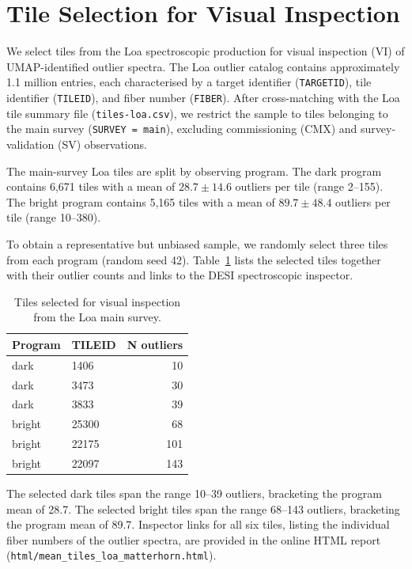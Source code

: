 \section{Tile Selection for Visual Inspection}

We select tiles from the Loa spectroscopic production for visual inspection (VI)
of UMAP-identified outlier spectra.
The Loa outlier catalog contains approximately 1.1 million entries,
each characterised by a target identifier (\texttt{TARGETID}), tile identifier (\texttt{TILEID}),
and fiber number (\texttt{FIBER}).
After cross-matching with the Loa tile summary file
(\texttt{tiles-loa.csv}), we restrict the sample to tiles belonging to the
main survey (\texttt{SURVEY = main}), excluding commissioning (CMX) and
survey-validation (SV) observations.

The main-survey Loa tiles are split by observing program.
The dark program contains 6{,}671 tiles with a mean of $28.7 \pm 14.6$ outliers per tile
(range 2--155).
The bright program contains 5{,}165 tiles with a mean of $89.7 \pm 48.4$ outliers per tile
(range 10--380).

To obtain a representative but unbiased sample, we randomly select three tiles
from each program (random seed 42).
Table~\ref{tab:vi_tiles_loa} lists the selected tiles together with their
outlier counts and links to the DESI spectroscopic inspector.

\begin{table}[h]
\centering
\caption{Tiles selected for visual inspection from the Loa main survey.}
\label{tab:vi_tiles_loa}
\begin{tabular}{llr}
\hline
Program & TILEID & N outliers \\
\hline
dark  & 1406  & 10  \\
dark  & 3473  & 30  \\
dark  & 3833  & 39  \\
\hline
bright & 25300 & 68  \\
bright & 22175 & 101 \\
bright & 22097 & 143 \\
\hline
\end{tabular}
\end{table}

The selected dark tiles span the range 10--39 outliers, bracketing the program mean of 28.7.
The selected bright tiles span the range 68--143 outliers, bracketing the program mean of 89.7.
Inspector links for all six tiles, listing the individual fiber numbers of the outlier
spectra, are provided in the online HTML report
(\texttt{html/mean\_tiles\_loa\_matterhorn.html}).
